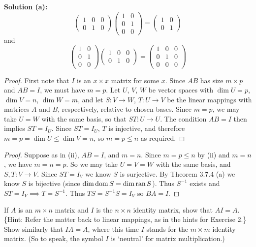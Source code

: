\textbf{Solution (a):}
\[
\begin{pmatrix} 1 & 0 & 0 \\ 0 & 1 & 0 \end{pmatrix}
\begin{pmatrix} 1 & 0 \\ 0 & 1 \\ 0 & 0 \end{pmatrix}
=
\begin{pmatrix} 1 & 0 \\ 0 & 1 \end{pmatrix}
\]
and 
\[
\begin{pmatrix} 1 & 0 \\ 0 & 1 \\ 0 & 0 \end{pmatrix}
\begin{pmatrix} 1 & 0 & 0 \\ 0 & 1 & 0 \end{pmatrix}
=
\begin{pmatrix} 1 & 0 & 0 \\ 0 & 1 & 0 \\ 0 & 0 & 0  \end{pmatrix}
\]

\begin{proof}
    First note that $I$ is an $x \times x$ matrix for some $x$.
    Since $AB$ has size $m \times p$ and $AB = I$, we must have $m = p$.
    Let $U$, $V$, $W$ be vector spaces with $\dim U = p$, $\dim V = n$, $\dim W = m$,
    and let $S: V \to W$, $T: U \to V$ be the linear mappings with matrices $A$ and
    $B$, respectively, relative to chosen bases.
    Since $m = p$, we may take $U = W$ with the same basis, so that $ST: U \to U$.
    The condition $AB = I$ then implies $ST = I_U$.
    Since $ST = I_U$, $T$ is injective, and therefore
    $m = p = \dim U \leq \dim V = n$,
    so $m = p \leq n$ as required.
\end{proof}

\begin{proof}
    Suppose as in (ii), $AB = I$, and $m = n$.
    Since $m = p \leq n$ by (ii) and $m = n$, we have $m = n = p$.
    So we may take $U = V = W$ with the same basis, and $S, T: V \to V$.
    Since $ST = I_V$ we know $S$ is surjective. By Theorem 3.7.4 (a) we know $S$ is bijective 
        (since $\dim \operatorname{dom} S = \dim \operatorname{ran} S$).
    Thus $S^{-1}$ exists and $ST = I_V \implies T = S^{-1}$.
    Thus $TS = S^{-1}S = I_V$ so $BA = I$.
\end{proof}


\begin{tcolorbox}[title=Exercise 3, breakable]
    If $A$ is an $m \times n$ matrix and $I$ is the $n \times n$ identity matrix, show
    that $AI = A$. \{Hint: Refer the matter back to linear mappings, as in the hints
    for Exercise 2.\} Show similarly that $IA = A$, where this time $I$ stands for
    the $m \times m$ identity matrix. (So to speak, the symbol $I$ is `neutral' for
    matrix multiplication.)
\end{tcolorbox}

